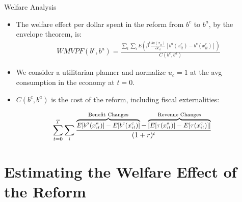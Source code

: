 \begin{frame}{Welfare Analysis}
    \begin{itemize}
        \item The welfare effect per dollar spent in the reform from $b^c$ to $b^a$, by the envelope theorem, is:
        \begin{align*}
            WMVPF(b^c,b^a)=\frac{\sum_t \sum_i E\left(\beta^t \frac{\partial u(x_{it})}{\partial c_{it}}[b^a(x^c_{it})-b^c(x^c_{it})]\right)}{C(b^c,b^a)}
        \end{align*}
        \item We consider a utilitarian planner and normalize $u_c=1$ at the avg consumption in the economy at $t=0$.
        \item $C(b^c,b^a)$ is the cost of the reform, including fiscal externalities:
    \end{itemize}
    \small
    \begin{align*}
        \small
        \sum_{t=0}^T \sum_i \frac{\overbrace{E[b^a(x_{it}^a)]-E[b^c(x_{it}^c)]}^{\text{Benefit Changes}}-
        \overbrace{\left[E[\tau(x_{it}^a)]-E[\tau(x_{it}^c)]\right]}^{\text{Revenue Changes}}}{(1+r)^t}
    \end{align*}
\end{frame}

\section{Estimating the Welfare Effect of the Reform}



